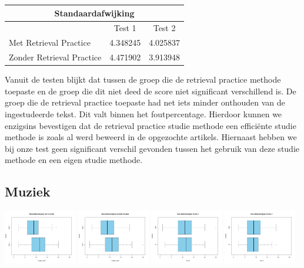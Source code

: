 \documentclass{hogent-article}
\begin{document}
	\begin{tabular}{ |p{10em}|c|c| }
	\hline
		\multicolumn{3}{|c|}{Standaardafwijking} \\
	\hline
		& Test 1 & Test 2 \\
	\hline
		Met Retrieval Practice & 4.348245 & 4.025837 \\
		Zonder Retrieval Practice & 4.471902 & 3.913948 \\
	\hline
	\end{tabular}
	
	Vanuit de testen blijkt dat tussen de groep die de retrieval practice methode toepaste en de groep die dit niet deed de score niet significant verschillend is. De groep die de retrieval practice toepaste had net iets minder onthouden van de ingestudeerde tekst. Dit valt binnen het foutpercentage. Hierdoor kunnen we enzigsins bevestigen dat de retrieval practice studie methode een efficiënte studie methode is zoals al werd beweerd in de opgezochte artikels. Hiernaast hebben we bij onze test geen significant verschil gevonden tussen het gebruik van deze studie methode en een eigen studie methode.
	
	\subsection{Muziek}
	\includegraphics[width=120px]{Rplot_MetMuziek}	
	\includegraphics[width=120px]{Rplot_ZonderMuziek}
	\includegraphics[width=120px]{Rplot_Muziek_Score1}
	\includegraphics[width=120px]{Rplot_Muziek_Score2}
	
\end{document}

